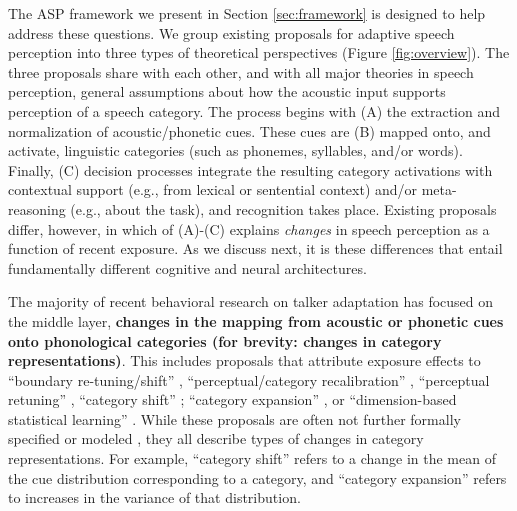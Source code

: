 \documentclass[
  11pt,
  man,floatsintext]{apa6}
\begin{document}
The ASP framework we present in Section \ref{sec:framework} is designed to help address these questions. We group existing proposals for adaptive speech perception into three types of theoretical perspectives (Figure \ref{fig:overview}). The three proposals share with each other, and with all major theories in speech perception, general assumptions about how the acoustic input supports perception of a speech category. The process begins with (A) the extraction and normalization of acoustic/phonetic cues. These cues are (B) mapped onto, and activate, linguistic categories (such as phonemes, syllables, and/or words). Finally, (C) decision processes integrate the resulting category activations with contextual support (e.g., from lexical or sentential context) and/or meta-reasoning (e.g., about the task), and recognition takes place. Existing proposals differ, however, in which of (A)-(C) explains \emph{changes} in speech perception as a function of recent exposure. As we discuss next, it is these differences that entail fundamentally different cognitive and neural architectures.

The majority of recent behavioral research on talker adaptation has focused on the middle layer, \textbf{changes in the mapping from acoustic or phonetic cues onto phonological categories (for brevity: changes in category representations)}. This includes proposals that attribute exposure effects to ``boundary re-tuning/shift'' \autocites[e.g.,][]{norris2003,reinisch2013}, ``perceptual/category recalibration'' \autocites[e.g.,][]{kraljic-samuel2006,reinisch-holt2013,samuel2016,vroomen-baart2009}, ``perceptual retuning'' \autocite{jesse-mcqueen2011,mcqueen2006,mitterer2013}, ``category shift'' \autocite{lindsay2022,sawusch-pisoni1976}; ``category expansion'' \autocite{schmale2012}, or ``dimension-based statistical learning'' \autocite{idemaru-holt2011,lehet-holt2020,liu-holt2015}. While these proposals are often not further formally specified or modeled \autocites[for notable exceptions, see][]{apfelbaum-mcmurray2015,clayards2008,hitczenko-feldman2016,kleinschmidt-jaeger2015,lancia-winter2013,xie2021cognition}, they all describe types of changes in category representations. For example, ``category shift'' refers to a change in the mean of the cue distribution corresponding to a category, and ``category expansion'' refers to increases in the variance of that distribution.
\end{document}
